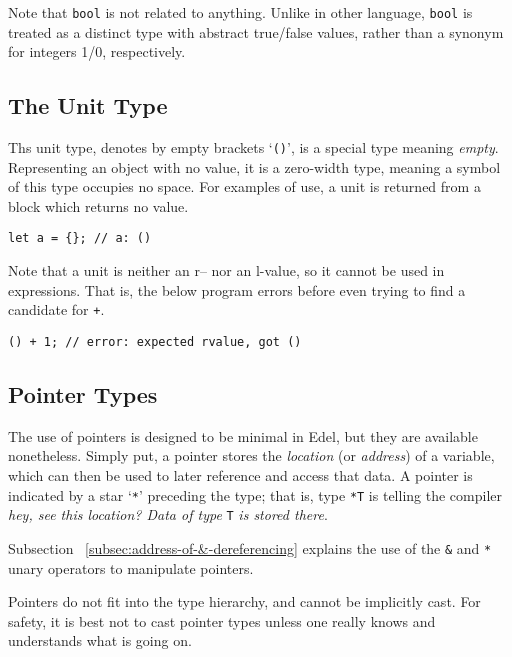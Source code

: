 \documentclass{article}
\begin{document}
    Note that \texttt{bool} is not related to anything.
    Unlike in other language, \texttt{bool} is treated as a distinct type with abstract true/false values, rather than a synonym for integers 1/0, respectively.

    \subsection{The Unit Type}

    Ths unit type, denotes by empty brackets `\texttt{()}', is a special type meaning \textit{empty}.
    Representing an object with no value, it is a zero-width type, meaning a symbol of this type occupies no space.
    For examples of use, a unit is returned from a block which returns no value.

    \begin{lstlisting}[language=CustomLang]
let a = {}; // a: ()
    \end{lstlisting}

    Note that a unit is neither an r-- nor an l-value, so it cannot be used in expressions.
    That is, the below program errors before even trying to find a candidate for \texttt{+}.

    \begin{lstlisting}[language=CustomLang]
() + 1; // error: expected rvalue, got ()
    \end{lstlisting}

    \subsection{Pointer Types}\label{subsec:pointer-types}

    The use of pointers is designed to be minimal in Edel, but they are available nonetheless.
    Simply put, a pointer stores the \textit{location} (or \textit{address}) of a variable, which can then be used to later reference and access that data.
    A pointer is indicated by a star `\texttt{*}' preceding the type;
    that is, type \texttt{*T} is telling the compiler \textit{hey, see this location? Data of type} \texttt{T} \textit{is stored there}.

    Subsection ~\ref{subsec:address-of-&-dereferencing} explains the use of the \texttt{\&} and \texttt{*} unary operators to manipulate pointers.

    Pointers do not fit into the type hierarchy, and cannot be implicitly cast.
    For safety, it is best not to cast pointer types unless one really knows and understands what is going on.
\end{document}
